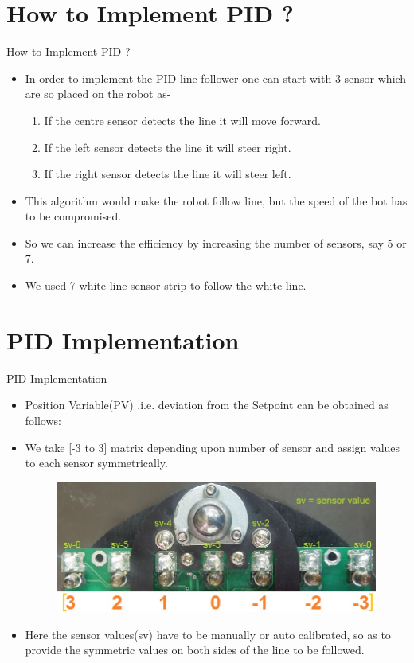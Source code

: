 \documentclass[10pt, a4paper]{beamer}
\begin{document}
	\section{How to Implement PID ?}
	\begin{frame}{How to Implement PID ?}
		\begin{itemize}
			\item In order to implement the PID line follower one can start with 3 sensor which are so placed on the robot as-
				\begin{enumerate}
				\item If the centre sensor detects the line it will move forward.
				\item If the left sensor detects the line it will steer right.
				\item If the right sensor detects the line it will steer left.  
				\end{enumerate} 
			\item This algorithm would make the robot follow line, but the speed of the bot has to be compromised.
			\item So we can increase the efficiency by increasing the number of sensors, say 5 or 7.
			\item We used 7 white line sensor strip to follow the white line.	
		\end{itemize}
	\end{frame}
	
	\section{PID Implementation}
		\begin{frame}{PID Implementation}
			 \begin{itemize}
				\item Position Variable(PV) ,i.e. deviation from the Setpoint can be obtained as follows:
				\item We take [-3 to 3] matrix depending upon number of sensor and assign values to each sensor symmetrically.
					\begin{figure}[h]
						\includegraphics[scale = 0.4]{7-white-line-sensor-strip.png}
					\end{figure}
				\item Here the sensor values(sv) have to be manually or auto calibrated, so as to provide the symmetric values on both sides of the line to be followed.  
  			\end{itemize}
		\end{frame}
\end{document}
